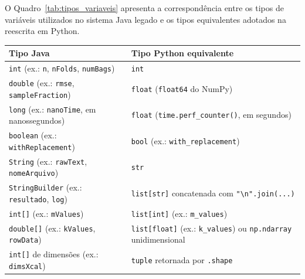 
O Quadro~\ref{tab:tipos_variaveis} apresenta a correspondência entre os tipos de variáveis utilizados no sistema Java legado e os tipos equivalentes adotados na reescrita em Python.

\begin{quadro}[ht]
\begin{center}
\footnotesize
\captionsetup{justification=centering, labelsep=endash, width=0.75\linewidth}
\caption{Equivalência entre os tipos de variáveis: Java e Python.}
\label{tab:tipos_variaveis}
\begin{threeparttable}
\renewcommand{\arraystretch}{1.15}
\begin{tabularx}{\textwidth}{|>{\raggedright\arraybackslash}X|>{\raggedright\arraybackslash}X|}
\hline
\textbf{Tipo Java} & \textbf{Tipo Python equivalente} \\ \hline
\texttt{int} (ex.: \texttt{n}, \texttt{nFolds}, \texttt{numBags}) & \texttt{int} \\ \hline
\texttt{double} (ex.: \texttt{rmse}, \texttt{sampleFraction}) & \texttt{float} (\texttt{float64} do NumPy) \\ \hline
\texttt{long} (ex.: \texttt{nanoTime}, em nanossegundos) & \texttt{float} (\texttt{time.perf\_counter()}, em segundos) \\ \hline
\texttt{boolean} (ex.: \texttt{withReplacement}) & \texttt{bool} (ex.: \texttt{with\_replacement}) \\ \hline
\texttt{String} (ex.: \texttt{rawText}, \texttt{nomeArquivo}) & \texttt{str} \\ \hline
\texttt{StringBuilder} (ex.: \texttt{resultado}, \texttt{log}) & \texttt{list[str]} concatenada com \texttt{"\textbackslash n".join(...)} \\ \hline
\texttt{int[]} (ex.: \texttt{mValues}) & \texttt{list[int]} (ex.: \texttt{m\_values}) \\ \hline
\texttt{double[]} (ex.: \texttt{kValues}, \texttt{rowData}) & \texttt{list[float]} (ex.: \texttt{k\_values}) ou \texttt{np.ndarray} unidimensional \\ \hline
\texttt{int[]} de dimensões (ex.: \texttt{dimsXcal}) & \texttt{tuple} retornada por \texttt{.shape} \\ \hline

\end{tabularx}
\end{threeparttable}
\end{center}
\end{quadro}
